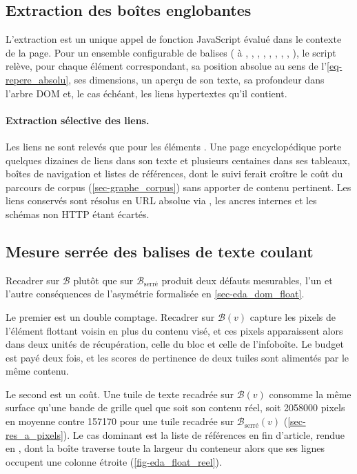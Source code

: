 \subsection{Extraction des boîtes englobantes}

L'extraction est un unique appel de fonction JavaScript évalué dans le contexte
de la page. Pour un ensemble configurable de balises ( à ,
, , , , , ,
, ), le script relève, pour chaque élément
correspondant, sa position absolue au sens de l'\cref{eq-repere_absolu}, ses
dimensions, un aperçu de son texte, sa profondeur dans l'arbre DOM et, le cas
échéant, les liens hypertextes qu'il contient.

\paragraph{Extraction sélective des liens.} Les liens ne sont relevés que pour
les éléments . Une page encyclopédique porte quelques dizaines de liens
dans son texte et plusieurs centaines dans ses tableaux, boîtes de navigation et
listes de références, dont le suivi ferait croître le coût du parcours de corpus
(\cref{sec-graphe_corpus}) sans apporter de contenu pertinent. Les liens
conservés sont résolus en URL absolue via , les ancres
internes et les schémas non HTTP étant écartés.

\subsection{Mesure serrée des balises de texte coulant}
\label{sec-rendu_textflow}

Recadrer sur $\mathcal{B}$ plutôt que sur $\mathcal{B}_{\text{serré}}$ produit
deux défauts mesurables, l'un et l'autre conséquences de l'asymétrie formalisée
en \cref{sec-eda_dom_float}.

Le premier est un double comptage. Recadrer sur $\mathcal{B}(v)$ capture les
pixels de l'élément flottant voisin en plus du contenu visé, et ces pixels
apparaissent alors dans deux unités de récupération, celle du bloc et celle de
l'infoboîte. Le budget est payé deux fois, et les scores de pertinence de deux
tuiles sont alimentés par le même contenu.

Le second est un coût. Une tuile de texte recadrée sur $\mathcal{B}(v)$ consomme
la même surface qu'une bande de grille quel que soit son contenu réel, soit
\num{2058000} pixels en moyenne contre \num{157170} pour une tuile recadrée sur
$\mathcal{B}_{\text{serré}}(v)$ (\cref{sec-res_a_pixels}). Le cas dominant est
la liste de références en fin d'article, rendue en , dont la boîte
traverse toute la largeur du conteneur alors que ses lignes occupent une colonne
étroite (\cref{fig-eda_float_reel}).

